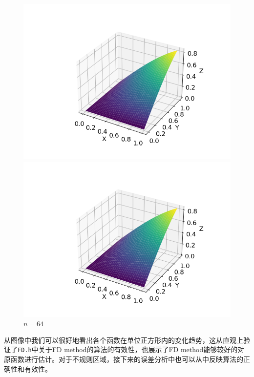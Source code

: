 \documentclass{ctexart}
\begin{document}
\begin{sloppypar}
\begin{figure}[H]
  \begin{minipage}[t]{0.5\linewidth}
    \centering
    \includegraphics[scale = 0.5]{f3_M_32.png}
    \caption{$n = 32$}
  \end{minipage}
  \begin{minipage}[t]{0.5\linewidth}
    \centering
    \includegraphics[scale = 0.5]{f3_M_64.png}
    \caption{$n = 64$}
  \end{minipage}
  \label{fig2}
\end{figure}

从图像中我们可以很好地看出各个函数在单位正方形内的变化趋势，这从直观上验证了\verb|FD.h|中关于FD method的算法的有效性，也展示了FD method能够较好的对原函数进行估计。对于不规则区域，接下来的误差分析中也可以从中反映算法的正确性和有效性。


\end{sloppypar}
\end{document}
